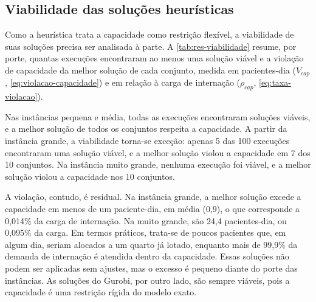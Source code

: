 \subsection{Viabilidade das soluções heurísticas}
\label{sec:res-viabilidade}

Como a heurística trata a capacidade como restrição flexível, a viabilidade de suas soluções precisa ser analisada à parte. A \autoref{tab:res-viabilidade} resume, por porte, quantas execuções encontraram ao menos uma solução viável e a violação de capacidade da melhor solução de cada conjunto, medida em pacientes-dia ($V_{cap}$, \autoref{eq:violacao-capacidade}) e em relação à carga de internação ($\rho_{cap}$, \autoref{eq:taxa-violacao}).

Nas instâncias pequena e média, todas as execuções encontraram soluções viáveis, e a melhor solução de todos os conjuntos respeita a capacidade. A partir da instância grande, a viabilidade torna-se exceção: apenas 5 das 100 execuções encontraram uma solução viável, e a melhor solução violou a capacidade em 7 dos 10 conjuntos. Na instância muito grande, nenhuma execução foi viável, e a melhor solução violou a capacidade nos 10 conjuntos.

A violação, contudo, é residual. Na instância grande, a melhor solução excede a capacidade em menos de um paciente-dia, em média (0,9), o que corresponde a 0,014\% da carga de internação. Na muito grande, são 24,4 pacientes-dia, ou 0,095\% da carga. Em termos práticos, trata-se de poucos pacientes que, em algum dia, seriam alocados a um quarto já lotado, enquanto mais de 99,9\% da demanda de internação é atendida dentro da capacidade. Essas soluções não podem ser aplicadas sem ajustes, mas o excesso é pequeno diante do porte das instâncias. As soluções do Gurobi, por outro lado, são sempre viáveis, pois a capacidade é uma restrição rígida do modelo exato.

